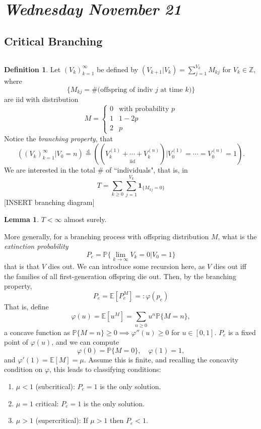 \documentclass[12pt]{amsart}
\newcommand{\disteq}{\overset{ \text{d} }{=}}
\newcommand{\Z}{\mathbb{Z}}    %
\newcommand{\E}{\mathbb{E}}    %
\renewcommand{\P}{\mathbb{P}}  %
\theoremstyle{definition}
\newtheorem{lemma}[thm]{Lemma}
\newtheorem{defn}[thm]{Definition}
\begin{document}
\section{\emph{Wednesday November 21}} 

\subsection{Critical Branching} $\,$

\begin{defn}

Let $(V_k)_{k=1} ^\infty$ be defined by $(V_{k+1} | V_k) = \sum_{j=1} ^{V_k} M_{kj}$ for $V_k \in \Z$, where 
$$
\{ M_{kj} = \# \text{(offspring of indiv $j$ at time $k$)} \} 
$$
are iid with distribution 
$$
M = 
\begin{cases}
0 & \text{with probability $p$} \\
1 & 1 - 2p\\
2 & p
\end{cases}
$$
Notice the \emph{branching property}, that
$$
( (V_k)_{k=1} ^\infty | V_0 = n ) \disteq ( ( \underset{ \text{iid} }{ V_k ^{(1)} + \cdots + V_k ^{(n)}} ) | V_0 ^{(1)} = \cdots = V_0 ^{(n)} = 1).
$$
We are interested in the total \# of ``individuals", that is, in 
$$
T = \sum_{k \geq 0} \sum_{j=1} ^{V_k} \mathbf{1}_{ \{ M_{kj} = 0 \} }
$$ 
[INSERT branching diagram]


\end{defn}


\begin{lemma}
$T < \infty$ almost surely.
\end{lemma}

More generally, for a branching process with offspring distribution $M$, what is the \emph{extinction probability}
$$
P_e = \P \{ \lim_{k \to \infty} V_k = 0 | V_0 = 1 \}
$$
that is that $V$ dies out. We can introduce some recursion here, as $V$ dies out iff the families of all first-generation offspring die out. Then, by the branching property, 
$$
P_e = \E [P_e^M] =: \varphi ( p_e)
$$
That is, define 
$$
\varphi (u) = \E [u^M] = \sum_{n \geq 0} u^n \P \{ M=n \},
$$
a concave function as $ \P \{ M=n \} \geq 0 \implies \varphi '' (u) \geq 0$ for $u \in [0,1]$. $P_e$ is a fixed point of $\varphi(u)$, and we can compute 
$$
\varphi (0) = \P \{ M = 0 \}, \quad \varphi (1) = 1,
$$
and $\varphi' (1) = \E [ M ] = \mu$. Assume this is finite, and recalling the concavity condition on $\varphi$, this leads to classifying conditions:

\begin{enumerate}
\item $\mu < 1$ (subcritical): $P_e = 1$ is the only solution.
\item $\mu = 1$ critical: $P_e = 1$ is the only solution.
\item $\mu > 1$ (supercritical): If $\mu > 1$ then $P_e < 1$. 
\end{enumerate}
\end{document}

